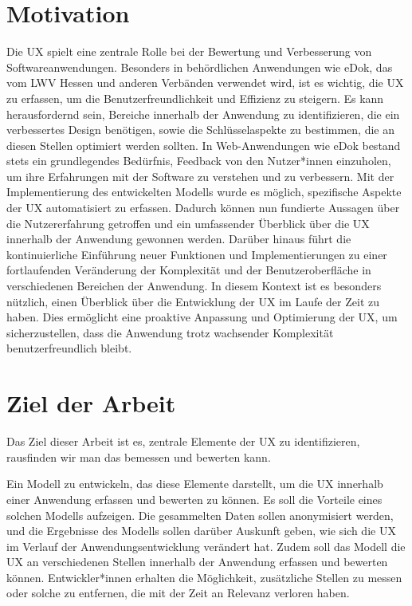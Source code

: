 \documentclass[12pt,oneside]{article}
\begin{document}
\section{Motivation}
Die UX spielt eine zentrale Rolle bei der Bewertung und Verbesserung von Softwareanwendungen. Besonders in behördlichen Anwendungen wie eDok, das vom LWV Hessen und anderen Verbänden verwendet wird, ist es wichtig, die UX zu erfassen, um die Benutzerfreundlichkeit und Effizienz zu steigern. Es kann herausfordernd sein, Bereiche innerhalb der Anwendung zu identifizieren, die ein verbessertes Design benötigen, sowie die Schlüsselaspekte zu bestimmen, die an diesen Stellen optimiert werden sollten.
In Web-Anwendungen wie eDok bestand stets ein grundlegendes Bedürfnis, Feedback von den Nutzer*innen einzuholen, um ihre Erfahrungen mit der Software zu verstehen und zu verbessern. Mit der Implementierung des entwickelten Modells wurde es möglich, spezifische Aspekte der UX automatisiert zu erfassen. Dadurch können nun fundierte Aussagen über die Nutzererfahrung getroffen und ein umfassender Überblick über die UX innerhalb der Anwendung gewonnen werden. Darüber hinaus führt die kontinuierliche Einführung neuer Funktionen und Implementierungen zu einer fortlaufenden Veränderung der Komplexität und der Benutzeroberfläche in verschiedenen Bereichen der Anwendung. In diesem Kontext ist es besonders nützlich, einen Überblick über die Entwicklung der UX im Laufe der Zeit zu haben. Dies ermöglicht eine proaktive Anpassung und Optimierung der UX, um sicherzustellen, dass die Anwendung trotz wachsender Komplexität benutzerfreundlich bleibt.


\section{Ziel der Arbeit}
Das Ziel dieser Arbeit ist es, zentrale Elemente der UX zu identifizieren, rausfinden wir man das bemessen und bewerten kann. 

Ein Modell zu entwickeln, das diese Elemente darstellt, um die UX innerhalb einer Anwendung erfassen und bewerten zu können. Es soll die Vorteile eines solchen Modells aufzeigen.
Die gesammelten Daten sollen anonymisiert werden, und die Ergebnisse des Modells sollen darüber Auskunft geben, wie sich die UX im Verlauf der Anwendungsentwicklung verändert hat. Zudem soll das Modell die UX an verschiedenen Stellen innerhalb der Anwendung erfassen und bewerten können. Entwickler*innen erhalten die Möglichkeit, zusätzliche Stellen zu messen oder solche zu entfernen, die mit der Zeit an Relevanz verloren haben.
\end{document}
